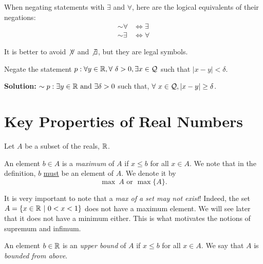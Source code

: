 When negating statements with $\exists$ and $\forall$, here are the logical equivalents of their negations:
\begin{align*}
    \sim \forall & \iff \exists \\
    \sim \exists & \iff \forall
\end{align*}

\begin{rem}  It is better to avoid $\not \forall$ and $\not \exists$, but they are legal symbols.
\end{rem}

\vspace*{.2cm}

\begin{example}
Negate the statement $p:\forall y \in \mathbb R,  \forall~\delta>0, \exists x \in {\cal Q}$ such that $|x-y| < \delta$. 
\end{example}

\vspace*{.2cm}

\textbf{Solution:}
$\sim p: \exists y \in \mathbb R \text{ and } \exists \delta >0$ such that, $\forall~x \in {\cal Q}, |x-y| \ge \delta $.
\Qed

\vspace*{.2cm}


\section{Key Properties of Real Numbers} 

Let $A$ be a subset of the reals, $\mathbb R$.\\

\begin{definition}
An element $b\in A$ is a \emph{maximum} of $A$ if $x \le b$ for all  $x\in A$. We note that in the definition, $b$ \underline{must} be an element of $A$. We denote it by $$\max~A \text{ or } \max \{ A\}.$$
\end{definition}

It is very important to note that a \emph{max of a set may not exist}! Indeed, the set $A = \{  x\in \mathbb R~|~ 0  < x < 1\}$ does not have a maximum element. We will see later that it does not have a minimum either. This is what motivates the notions of supremum and infimum.\\

\begin{definition}
An element $b\in \mathbb R$ is an \emph{upper bound} of $A$ if $x \le b$ for all  $x\in A$.  We say that $A$  is \emph{bounded from above}.
\end{definition}

